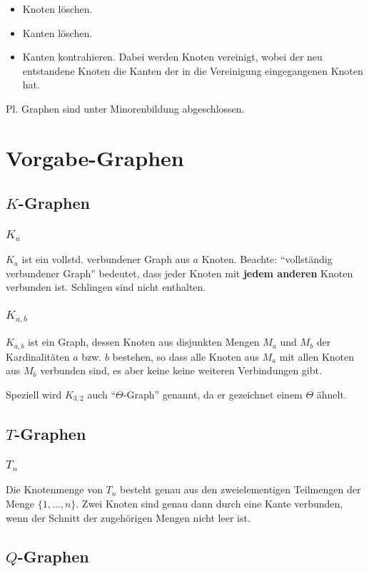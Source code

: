 \documentclass[a4paper,11pt]{report}
\begin{document}
\begin{itemize}
    \item Knoten löschen.
    \item Kanten löschen.
    \item Kanten kontrahieren. Dabei werden Knoten vereinigt, wobei der neu entstandene Knoten die Kanten der in die Vereinigung eingegangenen Knoten hat.
\end{itemize}

Pl. Graphen sind unter Minorenbildung abgeschlossen.


\chapter{Vorgabe-Graphen}
\section{$K$-Graphen}
\subsection{$K_a$}
$K_a$ ist ein vollstd. verbundener Graph aus $a$ Knoten. Beachte: ``vollständig verbundener Graph'' bedeutet, dass jeder Knoten mit {\bf jedem anderen} Knoten verbunden ist. Schlingen sind nicht enthalten.


\subsection{$K_{a, b}$}
$K_{a, b}$ ist ein Graph, dessen Knoten aus disjunkten Mengen $M_a$ und $M_b$ der Kardinalitäten $a$ bzw. $b$ bestehen, so dass alle Knoten aus $M_a$ mit allen Knoten aus $M_b$ verbunden sind, es aber keine keine weiteren Verbindungen gibt.

Speziell wird $K_{3, 2}$ auch ``$\Theta$-Graph'' genannt, da er gezeichnet einem $\Theta$ ähnelt.


\section{$T$-Graphen}
\subsection{$T_n$}
Die Knotenmenge von $T_n$ besteht genau aus den zweielementigen Teilmengen der Menge $\{1, \ldots, n\}$. Zwei Knoten sind genau dann durch eine Kante verbunden, wenn der Schnitt der zugehörigen Mengen nicht leer ist.


\section{$Q$-Graphen}
\end{document}
